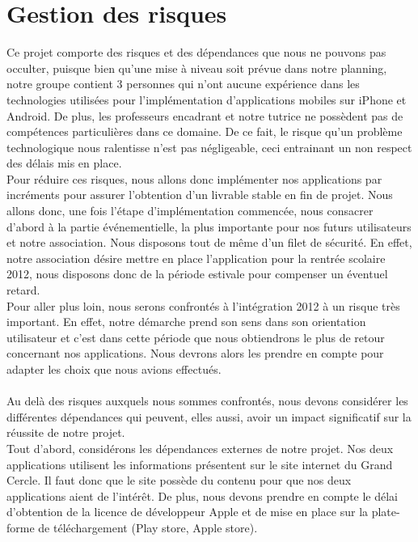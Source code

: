 \documentclass[a4paper,11px]{article}
\begin{document}
\section{\bf{Gestion des risques}}
\indent \indent Ce projet comporte des risques et des dépendances que nous ne pouvons pas occulter, puisque bien qu’une mise à niveau soit prévue dans notre planning, notre groupe contient 3 personnes qui n’ont aucune expérience dans les technologies utilisées pour l’implémentation d’applications mobiles sur iPhone et Android. De plus, les professeurs encadrant et notre tutrice ne possèdent pas de compétences particulières dans ce domaine. De ce fait, le risque qu’un problème technologique nous ralentisse n'est pas négligeable, ceci entrainant un non respect des délais mis en place.\\
\indent Pour réduire ces risques, nous allons donc implémenter nos applications par incréments pour assurer l’obtention d’un livrable stable en fin de projet. Nous allons donc, une fois l’étape d’implémentation commencée, nous consacrer d’abord à la partie événementielle, la plus importante pour nos futurs utilisateurs et notre association. Nous disposons tout de même d’un filet de sécurité. En effet, notre association désire mettre en place l’application pour la rentrée scolaire 2012, nous disposons donc de la période estivale pour compenser un éventuel retard.\\
\indent Pour aller plus loin, nous serons confrontés à l’intégration 2012 à un risque très important. En effet, notre démarche prend son sens dans son orientation utilisateur et c’est dans cette période que nous obtiendrons le plus de retour concernant nos applications. Nous devrons alors les prendre en compte pour adapter les choix que nous avions effectués.\\
\\
\indent Au delà des risques auxquels nous sommes confrontés, nous devons considérer les différentes dépendances qui peuvent, elles aussi, avoir un impact significatif sur la réussite de notre projet.\\
\indent Tout d’abord, considérons les dépendances externes de notre projet. Nos deux applications utilisent les informations présentent sur le site internet du Grand Cercle. Il faut donc que le site possède du contenu pour que nos deux applications aient de l’intérêt. De plus, nous devons prendre en compte le délai d’obtention de la licence de développeur Apple et de mise en place sur la plate-forme de téléchargement (Play store, Apple store).\\
\end{document}

